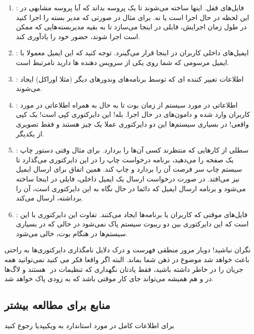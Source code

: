 \begin{enumerate}
\begin{enumerate}
\item {\large{}}:
فایل‌های قفل. اینها ساخته می‌شوند تا یک پروسه بداند که آیا پروسه مشابهی در این لحظه در حال اجرا است یا نه. برای مثال در صورتی که مدیر بسته
را اجرا کنید در طول زمان اجرایش، فایلی در اینجا می‌سازد تا به بقیه مدیربسته‌هایی که ممکن است اجرا شوند، حضور خود را یادآوری کند.
\item {\large{}}:
ایمیل‌های داخلی کاربران در اینجا قرار می‌گینرد. توجه کنید که این ایمیل معمولا با ایمیل مرسومی که شما روی یکی از سرویس دهنده ‌ها دارید نامرتبط است.
\item {\large{}}:
اطلاعات تغییر کننده ای که توسط برنامه‌های وندورهای دیگر (مثلا اوراکل) ایجاد می‌شوند.
\item {\large{}}:
اطلاعاتی در مورد سیستم از زمان بوت تا به حال به همراه اطلاعاتی در مورد کاربران وارد شده و دامون‌های در حال اجرا. بله! این دایرکتوری کپی
است! یک کپی واقعی! در بسیاری سیستم‌ها این دو دایرکتوری عملا یک چیز هستند و فقط تصویری از یکدیگر.
\item {\large{}}:
سطلی از کارهایی که منتظرند کسی آن‌ها را بردارد. برای مثال وقتی دستور چاپ یک صفحه را می‌دهید، برنامه درخواست چاپ را در این دایرکتوری می‌گذارد تا سیستم چاپ سر فرصت آن را بردارد و چاپ کند. همین اتفاق برای ارسال ایمیل نیز می‌افتد. در صورت درخواست ارسال یک ایمیل داخلی، فایلی در اینجا ساخته می‌شود و برنامه ارسال ایمیل که دائما در حال نگاه به این دایرکتوری است، آن را برداشته، ارسال می‌کند.
\item {\large{}}:
فایل‌های موقتی که کاربران یا برنامه‌ها ایجاد می‌کنند. تفاوت این دایرکتوری با 
 این است که این دایرکتوری بین دو ریبوت سیستم پاک نمی‌شود در حالی که 
 در بسیاری سیستم‌ها در هنگام بوت، خالی می‌شود.
\end{enumerate}
\end{enumerate}
نگران نباشید! دوبار مرور منطقی فهرست و درک دلایل نامگذاری دایرکتوری‌ها به راحتی باعث خواهد شد موضوع در ذهن شما بماند. البته اگر واقعا فکر می کنید نمی‌توانید همه جریان را در خاطر داشته باشید، فقط یادتان نگهداری که تنظیمات در ‌
 هستند و لاگ‌ها در 
 و 
 هم همیشه می‌تواند جای کار موقتی باشد که به زودی پاک خواهد شد.
\subsection*{منابع برای مطالعه بیشتر}
برای اطلاعات کامل در مورد استاندارد 
 به ویکیپدیا رجوع کنید
